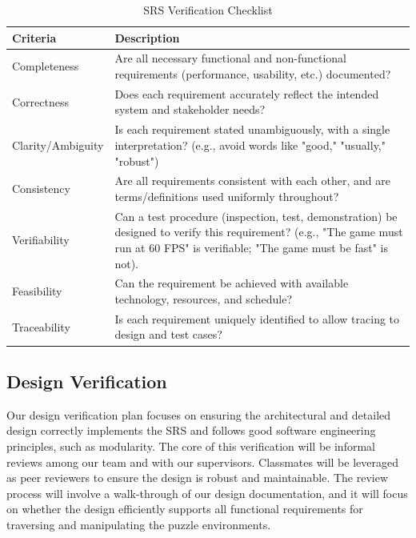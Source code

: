 \documentclass[12pt, titlepage]{article}
\begin{document}
\begin{table}[H]
\caption{SRS Verification Checklist}
\begin{tabular}{|p{4cm}|p{11cm}|}
\hline
\textbf{Criteria} & \textbf{Description}                                                                                                                                                                \\ \hline
Completeness      & Are all necessary functional and non-functional requirements (performance, usability, etc.) documented?                                                                             \\ \hline
Correctness       & Does each requirement accurately reflect the intended system and stakeholder needs?                                                                                                 \\ \hline
Clarity/Ambiguity & Is each requirement stated unambiguously, with a single interpretation? (e.g., avoid words like "good," "usually," "robust")                                                        \\ \hline
Consistency       & Are all requirements consistent with each other, and are terms/definitions used uniformly throughout?                                                                               \\ \hline
Verifiability     & Can a test procedure (inspection, test, demonstration) be designed to verify this requirement? (e.g., "The game must run at 60 FPS" is verifiable; "The game must be fast" is not). \\ \hline
Feasibility       & Can the requirement be achieved with available technology, resources, and schedule?                                                                                                 \\ \hline
Traceability      & Is each requirement uniquely identified to allow tracing to design and test cases?                                                                                                  \\ \hline
\end{tabular}
\end{table}

\subsection{Design Verification}

Our design verification plan focuses on ensuring the architectural and detailed design
correctly implements the SRS and follows good software engineering principles, such as modularity.
The core of this verification will be informal reviews among our team and with our supervisors.
Classmates will be leveraged as peer reviewers to ensure the design is robust and maintainable.
The review process will involve a walk-through of our design documentation, and it will focus
on whether the design efficiently supports all functional requirements for traversing and
manipulating the puzzle environments.
\end{document}
